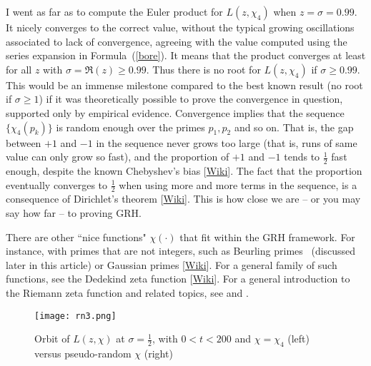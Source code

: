 \documentclass[oneside,10pt]{book}
\begin{document}
I went as far as to compute the Euler product for $L(z,\chi_4)$ when $z=\sigma=0.99$. It nicely converges to the correct value, without the typical
 growing oscillations associated to lack of convergence,
 agreeing with the value computed using the series expansion in Formula~(\ref{bore}). It means that the product converges at least for all $z$ with
 $\sigma=\Re(z)\geq 0.99$. Thus there is no root for $L(z,\chi_4)$ if $\sigma\geq 0.99$. This would be an immense milestone compared to the best known result (no root if $\sigma\geq 1$) if it was theoretically possible to prove the convergence in question, supported only by empirical evidence.
 Convergence implies that the sequence $\{\chi_4(p_k)\}$ is random enough over the primes $p_1,p_2$ and so on. That is, the gap between $+1$ and $-1$ in the sequence never grows too large (that is, runs of same value can only grow so fast), and the proportion of $+1$ and $-1$ tends to $\frac{1}{2}$ fast enough, despite the known \textcolor{index}{Chebyshev's bias} [\href{https://en.wikipedia.org/wiki/Chebyshev\%27s_bias}{Wiki}]. The fact that the proportion eventually converges to $\frac{1}{2}$ when using more and more terms in the sequence, is a consequence
 of \textcolor{index}{Dirichlet's theorem} [\href{https://en.wikipedia.org/wiki/Dirichlet\%27s_theorem_on_arithmetic_progressions}{Wiki}]. This is how close we are -- or you may say how far -- to proving GRH.

There are other ``nice functions" $\chi(\cdot)$ that fit within the GRH framework. For instance, with primes that are not integers, such as Beurling primes~\cite{bzf2004} (discussed later in this article) or \textcolor{index}{Gaussian primes} [\href{https://en.wikipedia.org/wiki/Gaussian_integer}{Wiki}]. For a general family of such functions, see the \textcolor{index}{Dedekind zeta function} [\href{https://en.wikipedia.org/wiki/Dedekind_zeta_function}{Wiki}]. For a general introduction to the Riemann zeta function and related topics, see \cite{kconrad2018} and \cite{tdr1987}.

\begin{figure}[H]
\centering
\texttt{[image: rn3.png]}
\caption{Orbit of $L(z,\chi)$ at $\sigma=\frac{1}{2}$, with $0<t<200$ and $\chi=\chi_4$ (left) versus pseudo-random $\chi$ (right)}
\label{fig:rn2x}
\end{figure}
\end{document}
